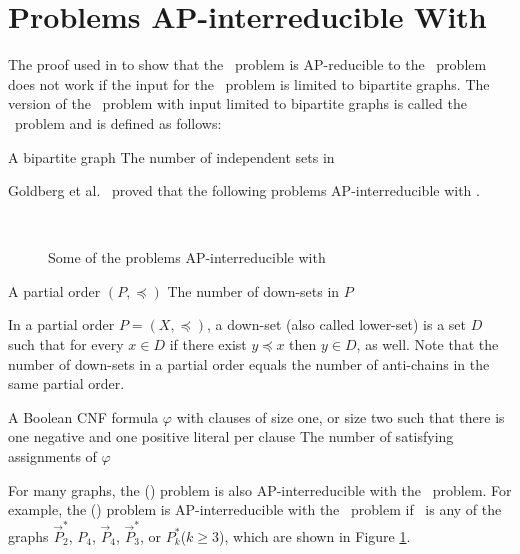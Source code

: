 \section{Problems AP-interreducible With \cbis} \label{sec:bis}
The proof used in \cite{Leslie03} to show that the \csat\ problem is AP-reducible
to the \cisp\ problem does 
not work if the input for the \cisp\ problem is limited to bipartite graphs.
The version of the \cisp\ problem with input limited to bipartite graphs is called
the \cbis\ problem and is defined as follows:

\pnndef%
{A bipartite graph \mG}
{The number of independent sets in \mG}

Goldberg et al.~\cite{Leslie03} proved that the following problems AP-interreducible with \cbis\@.

\begin{figure}[h]
\centering
{}\hfill 
\subfigure[\ensuremath{P_4}]{\label{fig:p4}}\hfill
{}\\
{}\hfill
\subfigure[\ensuremath{P^*_k}]{\label{fig:psk}}
\caption{Some of the problems AP-interreducible with \cbis}
\label{fig:bisred}
\end{figure} 

\pdef{\cdsp}
{A partial order \((P,\preceq)\)}
{The number of down-sets in \(P\)}

In a partial order \(P=(X,\preceq)\), a down-set (also called lower-set) is a set \(D\) such that 
for every \(x\in D\) if there exist \(y \preceq x\) then \(y\in D\), as well.
Note that the number of down-sets in a partial order equals
the number of anti-chains in the same partial order. 

{A Boolean CNF formula \(\varphi\) with clauses of size one, or size two such that
there is one negative and one positive literal per clause}
{The number of satisfying assignments of \(\varphi\)}


For many graphs, the \chom(\mH) problem is also AP-interreducible with the \cbis\ problem.
For example, the \chom(\mH) problem is AP-interreducible with the \cbis\ problem
if \mH\ is any of the graphs \(\vec{P}^*_2\), \(P_4\), \(\vec{P}_4\), \(\vec{P}^*_3\),
or \(P^*_k\)(\(k\ge 3\)), which are shown in Figure \ref{fig:bisred}\@.
 
